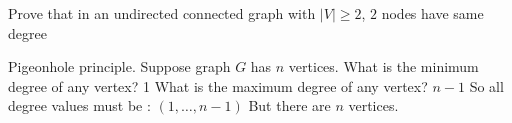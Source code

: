 \question Prove that in an undirected connected graph with $|V| \geq 2$, 
$2$ nodes have same degree
\begin{solution}
Pigeonhole principle. Suppose graph $G$ has $n$ vertices.
What is the minimum degree of any vertex? 1
What is the maximum degree of any vertex? $n - 1$
So all degree values must be : $(1, \dotsc, n - 1)$
But there are $n$ vertices.
\end{solution}

\clearpage
